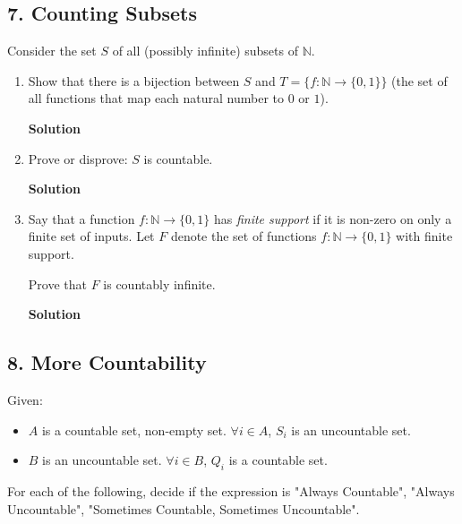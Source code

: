 \documentclass{article}\usepackage{amsmath,amssymb,amsthm,tikz,tkz-graph,color,chngpage,soul,hyperref,csquotes,graphicx,floatrow}\newcommand*{\QEDB}{\hfill\ensuremath{\square}}\newtheorem*{prop}{Proposition}\renewcommand{\theenumi}{\alph{enumi}}\usepackage[shortlabels]{enumitem}\usepackage[nobreak=true]{mdframed}\usetikzlibrary{matrix,calc}\MakeOuterQuote{"}\usepackage[margin=0.75in]{geometry} \newtheorem{theorem}{Theorem}
\begin{document}
\subsection*{7. Counting Subsets}
Consider the set $S$ of all (possibly infinite) subsets of $\mathbb{N}$.
\begin{enumerate}
\item Show that there is a bijection between $S$ and $T=\{f:\mathbb{N}\to\{0,1\}\}$ (the set of all functions that map each natural number to $0$ or $1$).
\begin{mdframed}
\textbf{Solution}

\end{mdframed}
\item Prove or disprove: $S$ is countable.
\begin{mdframed}
\textbf{Solution}

\end{mdframed}
\item Say that a function $f:\mathbb{N}\to\{0,1\}$ has \textit{finite support} if it is non-zero on only a finite set of inputs. Let $F$ denote the set of functions $f:\mathbb{N}\to\{0,1\}$ with finite support.

\noindent Prove that $F$ is countably infinite.
\begin{mdframed}
\textbf{Solution}

\end{mdframed}
\end{enumerate}
\clearpage

\subsection*{8. More Countability}
Given:
\begin{itemize}
\item $A$ is a countable set, non-empty set. $\forall i\in A$, $S_i$ is an uncountable set.
\item $B$ is an uncountable set. $\forall i\in B$, $Q_i$ is a countable set.
\end{itemize}
For each of the following, decide if the expression is "Always Countable", "Always Uncountable", "Sometimes Countable, Sometimes Uncountable".
\end{document}
